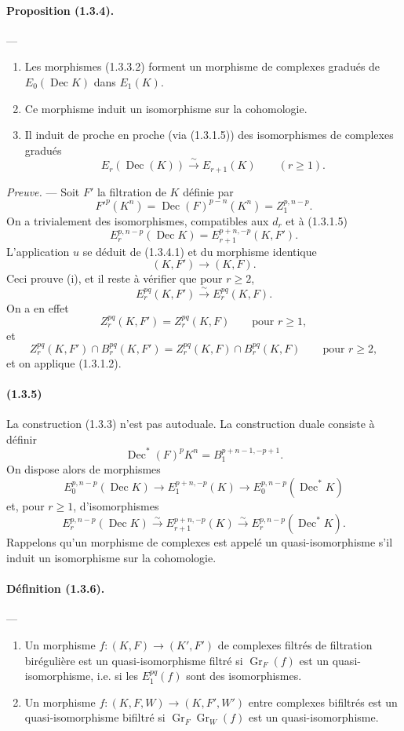 \documentclass[10pt]{article}
\newcommand{\Gr}{\operatorname{Gr}}
\newcommand{\iso}{\xrightarrow{\sim}}
\newcommand{\Dec}{\operatorname{Dec}}
\begin{document}
\paragraph{Proposition (1.3.4).} ---
\begin{enumerate}[label=(\roman*)]
\item Les morphismes (1.3.3.2) forment un morphisme de complexes gradués de $E_0(\Dec K)$ dans $E_1(K)$.
\item Ce morphisme induit un isomorphisme sur la cohomologie.
\item Il induit de proche en proche (via (1.3.1.5)) des isomorphismes de complexes gradués
\[
E_r(\Dec(K))\iso E_{r+1}(K)\qquad(r\ge1).
\]
\end{enumerate}

\emph{Preuve.} --- Soit $F'$ la filtration de $K$ définie par
\[
F'^p(K^n)=\Dec(F)^{p-n}(K^n)=Z_1^{p,n-p}.
\]
On a trivialement des isomorphismes, compatibles aux $d_r$ et à (1.3.1.5)
\[
\tag{1.3.4.1}
E_r^{p,n-p}(\Dec K)=E_{r+1}^{p+n,-p}(K,F').
\]
L'application $u$ se déduit de (1.3.4.1) et du morphisme identique
\[
(K,F')\longrightarrow(K,F).
\]
Ceci prouve (i), et il reste à vérifier que pour $r\ge2$,
\[
E_r^{pq}(K,F')\iso E_r^{pq}(K,F).
\]
On a en effet
\[
Z_r^{pq}(K,F')=Z_r^{pq}(K,F)\qquad\text{pour }r\ge1,
\]
et
\[
Z_r^{pq}(K,F')\cap B_r^{pq}(K,F')=Z_r^{pq}(K,F)\cap B_r^{pq}(K,F)\qquad\text{pour }r\ge2,
\]
et on applique (1.3.1.2).

\paragraph{(1.3.5)} La construction (1.3.3) n'est pas autoduale. La construction duale consiste à définir
\[
\Dec^*(F)^pK^n=B_1^{p+n-1,-p+1}.
\]
On dispose alors de morphismes
\[
E_0^{p,n-p}(\Dec K)\longrightarrow E_1^{p+n,-p}(K)\longrightarrow E_0^{p,n-p}(\Dec^*K)
\]
et, pour $r\ge1$, d'isomorphismes
\[
E_r^{p,n-p}(\Dec K)\iso E_{r+1}^{p+n,-p}(K)\iso E_r^{p,n-p}(\Dec^*K).
\]
Rappelons qu'un morphisme de complexes est appelé un quasi-isomorphisme s'il induit un isomorphisme sur la cohomologie.

\paragraph{Définition (1.3.6).} ---
\begin{enumerate}[label=(\roman*)]
\item Un morphisme $f:(K,F)\to(K',F')$ de complexes filtrés de filtration birégulière est un quasi-isomorphisme filtré si $\Gr_F(f)$ est un quasi-isomorphisme, i.e. si les $E_1^{pq}(f)$ sont des isomorphismes.
\item Un morphisme $f:(K,F,W)\to(K,F',W')$ entre complexes bifiltrés est un quasi-isomorphisme bifiltré si $\Gr_F\Gr_W(f)$ est un quasi-isomorphisme.
\end{enumerate}
\end{document}
